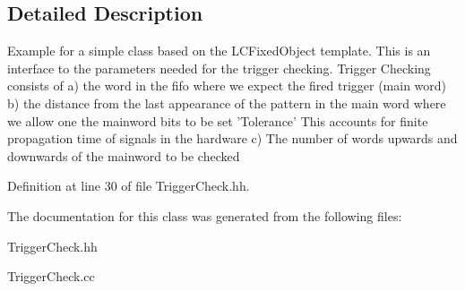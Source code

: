 \subsection{Detailed Description}
Example for a simple class based on the LCFixedObject template. This is an interface to the parameters needed for the trigger checking. Trigger Checking consists of a) the word in the fifo where we expect the fired trigger (main word) b) the distance from the last appearance of the pattern in the main word where we allow one the mainword bits to be set 'Tolerance' This accounts for finite propagation time of signals in the hardware c) The number of words upwards and downwards of the mainword to be checked 

Definition at line 30 of file TriggerCheck.hh.

The documentation for this class was generated from the following files:\begin{DoxyCompactItemize}
\item 
TriggerCheck.hh\item 
TriggerCheck.cc\end{DoxyCompactItemize}
